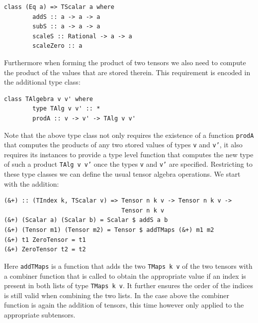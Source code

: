 \documentclass[a4paper,12pt, DIV=14, BCOR=5mm, twoside, headsepline]{scrbook}
\begin{document}
\begin{samepage} 
\begin{verbatim}
class (Eq a) => TScalar a where 
        addS :: a -> a -> a 
        subS :: a -> a -> a
        scaleS :: Rational -> a -> a 
        scaleZero :: a
\end{verbatim} 
\end{samepage}

Furthermore when forming the product of two tensors we also need to compute the product of the values that are stored therein. This requirement is encoded in the additional type class:

\begin{samepage} 
\begin{verbatim}
class TAlgebra v v' where 
        type TAlg v v' :: * 
        prodA :: v -> v' -> TAlg v v'
\end{verbatim} 
\end{samepage}

Note that the above type class not only requires the existence of a function \texttt{prodA} that computes the products of any two stored values of types \texttt{v} and \texttt{v'}, it also requires its instances to provide a type level function that computes the new type of such a product \texttt{TAlg v v'} once the types \texttt{v} and \texttt{v'} are specified. Restricting to these type classes we can define the usual tensor algebra operations. We start with the addition:

\begin{samepage} 
\begin{verbatim}
(&+) :: (TIndex k, TScalar v) => Tensor n k v -> Tensor n k v -> 
                                 Tensor n k v 
(&+) (Scalar a) (Scalar b) = Scalar $ addS a b 
(&+) (Tensor m1) (Tensor m2) = Tensor $ addTMaps (&+) m1 m2     
(&+) t1 ZeroTensor = t1
(&+) ZeroTensor t2 = t2 
\end{verbatim} 
\end{samepage}

Here \texttt{addTMaps} is a function that adds the two \texttt{TMaps k v} of the two tensors with a combiner function that is called to obtain the appropriate value if an index is present in both lists of type \texttt{TMaps k v}. It further ensures the order of the indices is still valid when combining the two lists. In the case above the combiner function is again the addition of tensors, this time however only applied to the appropriate subtensors. 
\end{document}
